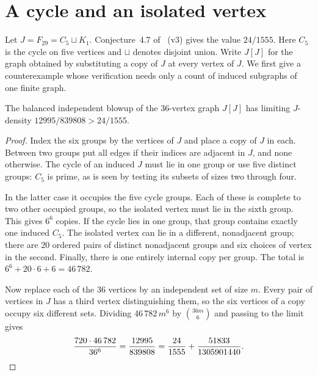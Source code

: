 \section{A cycle and an isolated vertex}\label{sec:cycle}

Let \(J=F_{29}=C_5\sqcup K_1\). Conjecture~4.7 of~\cite{six} (v3)
gives the value \(24/1555\). Here \(C_5\) is the cycle on five vertices
and \(\sqcup\) denotes disjoint union. Write \(J[J]\) for the graph
obtained by substituting a copy of \(J\) at every vertex of \(J\).
We first give a counterexample whose
verification needs only a count of induced subgraphs of one finite graph.

\begin{theorem}\label{th:cycle}
The balanced independent blowup of the \(36\)-vertex graph \(J[J]\)
has limiting \(J\)-density \(12995/839808>24/1555\).
\end{theorem}

\begin{proof}
Index the six groups by the vertices of \(J\) and place a copy of \(J\)
in each. Between two groups put all edges if their indices are adjacent
in \(J\), and none otherwise. The cycle of an induced \(J\) must
lie in one group or use five distinct groups: \(C_5\) is prime, as is
seen by testing its subsets of sizes two through four.

In the latter case it occupies the five cycle groups. Each of these
is complete to two other occupied groups, so the isolated vertex must
lie in the sixth group. This gives \(6^6\) copies. If the cycle lies in
one group, that group contains exactly one induced \(C_5\). The isolated
vertex can lie in a different, nonadjacent group; there are \(20\)
ordered pairs of distinct nonadjacent groups and six choices of vertex
in the second. Finally, there is one entirely internal copy per group.
The total is \(6^6+20\cdot6+6=46\,782\).

Now replace each of the 36 vertices by an independent set of size \(m\).
Every pair of vertices in \(J\) has a third vertex distinguishing them,
so the six vertices of a copy occupy six different sets. Dividing
\(46\,782\,m^6\) by \(\binom{36m}6\) and passing to the limit gives
\[
 \frac{720\cdot46\,782}{36^6}=\frac{12995}{839808}
 =\frac{24}{1555}+\frac{51833}{1305901440}.
 \qedhere
\]
\end{proof}


